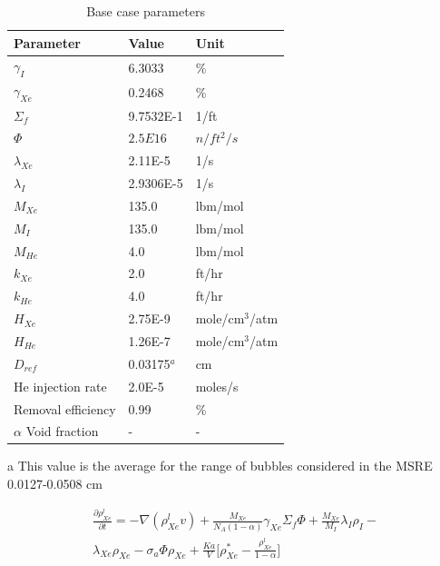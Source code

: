 \begin{table}[htbp!]
   \caption{\label{tab:simple_loop_test_parameters} Base case parameters}
   \centering
   \begin{tabular}{lll}
   \hline
   \textbf{Parameter} & \textbf{Value} & \textbf{Unit} \\
   \hline 
   $\gamma_{I}$ & $6.3033$ \cite{cole2019}& $\%$ \\ [1ex]
   $\gamma_{Xe}$ & 0.2468 \cite{cole2019}& \% \\ [1ex]
   $\Sigma_{f}$ & 9.7532E-1 \cite{cole2019}& 1/ft \\ [1ex]
   $\Phi$ & $2.5E16$ \cite{nestor1960}& $n/ft^{2}/s$ \\ [1ex]
   $\lambda_{Xe}$ & 2.11E-5 \cite{cole2019}& 1/s\\ [1ex]
   $\lambda_{I}$ & 2.9306E-5 \cite{cole2019}& 1/s  \\ [1ex]
   $M_{Xe}$ & 135.0 & lbm/mol\\ [1ex]
   $M_{I}$ & 135.0 & lbm/mol \\ [1ex]
   $M_{He}$ & 4.0 & lbm/mol \\ [1ex]
   $k_{Xe}$ & 2.0 \cite{houtzeel1967} & ft/hr\\ [1ex]
   $k_{He}$ & 4.0 \cite{engel1971} & ft/hr \\ [1ex]
   $H_{Xe}$ & 2.75E-9 \cite{houtzeel1967} & mole/cm${}^{3}$/atm \\ [1ex]
   $H_{He}$ & 1.26E-7 \cite{engel1971} & mole/cm${}^{3}$/atm \\ [1ex]
   $D_{ref}$ & 0.03175${}^{a}$  & cm \\ [1ex]
   He injection rate & 2.0E-5 & moles/s \\ [1ex]
   Removal efficiency & 0.99 & \% \\ [1ex] 
   $\alpha$ Void fraction & - & - \\ [1ex]
   \hline
      \end{tabular}
    \begin{tablenotes}\footnotesize
   \item[a] This value is the average for the range of bubbles considered in the MSRE 0.0127-0.0508 cm \cite{engel1971}
   \end{tablenotes}

\end{table}

\begin{equation}
\begin{split}
    \frac{\partial \rho_{Xe}^{l}}{\partial t} = -\nabla (\rho_{Xe}^{l}v) + \frac{M_{Xe}}{N_{A}(1-\alpha)} \gamma_{Xe}\Sigma_{f}\Phi + \frac{M_{Xe}}{M_{I}}\lambda_{I}\rho_{I} -  \\ \lambda_{Xe}\rho_{Xe} - \sigma_{a}\Phi\rho_{Xe} +   \frac{Ka}{V}\Big[\rho_{Xe}^{*} - \frac{\rho_{Xe}^{l}}{1-\alpha}\Big]
    \label{eq:XenonLiqCaseStudyDiffEq}
\end{split}
\end{equation}

